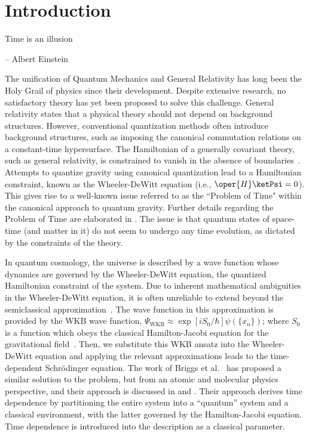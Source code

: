 \chapter{Introduction\label{chap:introduction}}

\epigraph{ \myopeningquote Time is an illusion \myclosingquote}{-- Albert Einstein}

The unification of Quantum Mechanics and General Relativity has long been the Holy Grail of physics 
since their development. Despite extensive research, no satisfactory theory has yet been proposed 
to solve this challenge. General relativity states that a physical theory should not depend on 
background structures. However, conventional quantization methods often introduce background structures, 
such as imposing the canonical commutation relations on a constant-time hypersurface. The Hamiltonian 
of a generally covariant theory, such as general relativity, is constrained to vanish in the absence 
of boundaries~\cite{gielen2023quantum}. Attempts to quantize gravity using canonical quantization 
lead to a Hamiltonian constraint, known as the Wheeler-DeWitt equation (i.e., \(\oper{H} \ketPsi = 0\)). 
This gives rise to a well-known issue referred to as the ``Problem of Time" within the canonical 
approach to quantum gravity. Further details regarding the Problem of Time are elaborated in 
. The issue is that quantum 
states of space-time (and matter in it) do not seem to undergo any time evolution, as dictated by 
the constraints of the theory.

In quantum cosmology, the universe is described by a wave function whose dynamics are governed 
by the Wheeler-DeWitt equation, the quantized Hamiltonian constraint of the system. Due to inherent 
mathematical ambiguities in the Wheeler-DeWitt equation, it is often unreliable to extend beyond the 
semiclassical approximation~\cite{cooke2010qcintro}. The wave function in this approximation is provided 
by the WKB wave function, \(\Psi_{\mathrm{WKB}} 
\approx \exp\left[iS_0/\hbar\right]\psi(\{x_n\})\); where \(S_0\) is a function which obeys the classical 
Hamilton-Jacobi equation for the gravitational field~\cite{gielen2023quantum}. Then, we substitute this 
WKB ansatz into the Wheeler-DeWitt equation and applying the relevant approximations leads to the 
time-dependent Schr\"odinger equation. The work of Briggs et al.~\cite{briggs2001derivation} 
has proposed a similar solution to the problem, but from an atomic and molecular physics perspective, 
and their approach is discussed in  and .
Their approach derives time dependence by partitioning the entire system into a ``quantum'' system and a classical 
environment, with the latter governed by the Hamilton-Jacobi equation. Time dependence is introduced into the 
description as a classical parameter.


